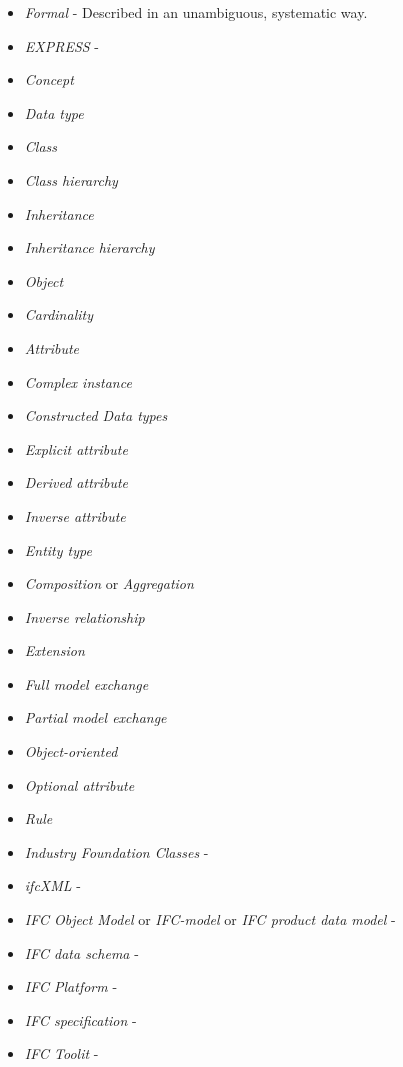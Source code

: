 \begin{itemize}
    
    \item \emph{Formal} - Described in an unambiguous, systematic way.
    \item \emph{EXPRESS} - 
    \item \emph{Concept}
    \item \emph{Data type} 
    \item \emph{Class} 
    \item \emph{Class hierarchy} 
    \item \emph{Inheritance} 
    \item \emph{Inheritance hierarchy} 
    \item \emph{Object} 
    \item \emph{Cardinality} 
    \item \emph{Attribute} 
    \item \emph{Complex instance}
    \item \emph{Constructed Data types}
    \item \emph{Explicit attribute} 
    \item \emph{Derived attribute} 
    \item \emph{Inverse attribute} 
    \item \emph{Entity type} 
    \item \emph{Composition} or \emph{Aggregation}
    \item \emph{Inverse relationship}
    \item \emph{Extension}
    \item \emph{Full model exchange}
    \item \emph{Partial model exchange}
    \item \emph{Object-oriented}
    \item \emph{Optional attribute}
    \item \emph{Rule} 
    
    
    \item \emph{Industry Foundation Classes} - 
    \item \emph{ifcXML} - 
    \item \emph{IFC Object Model} or \emph{IFC-model} or \emph{IFC product data model} - 
    \item \emph{IFC data schema} - 
    \item \emph{IFC Platform} - 
    \item \emph{IFC specification} - 
    \item \emph{IFC Toolit} - 

    
    

\end{itemize}
